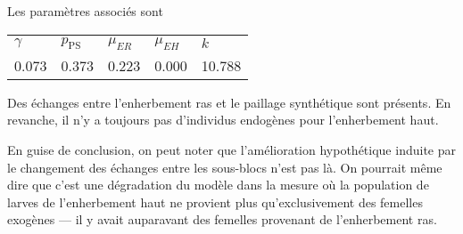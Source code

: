 \documentclass[a4paper, 11pt]{article}
\begin{document}
Les paramètres associés sont
\begin{center}
\begin{tabular}{lllll}
$\gamma$ & $p_{\text{PS}}$ & $\mu_{ER}$ & $\mu_{EH}$ & $k$\\
0.073 & 0.373 & 0.223 & 0.000 & 10.788
\end{tabular}
\end{center}

Des échanges entre l'enherbement ras et le paillage synthétique sont présents. En revanche, il n'y a toujours pas d'individus endogènes pour l'enherbement haut.

En guise de conclusion, on peut noter que l'amélioration hypothétique induite par le changement des échanges entre les sous-blocs n'est pas là. On pourrait même dire que c'est une dégradation du modèle dans la mesure où la population de larves de l'enherbement haut ne provient plus qu'exclusivement des femelles exogènes --- il y avait auparavant des femelles provenant de l'enherbement ras.
\end{document}
